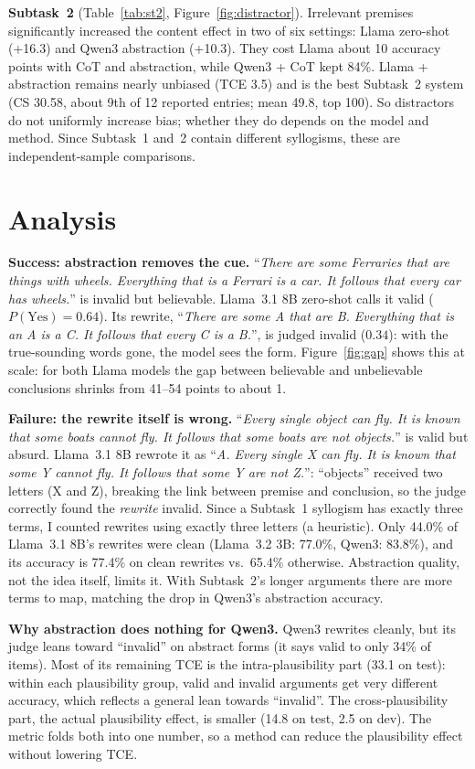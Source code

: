 \documentclass[11pt,letterpaper]{article}
\begin{document}
\textbf{Subtask~2} (Table~\ref{tab:st2}, Figure~\ref{fig:distractor}). Irrelevant premises significantly increased the content effect in two of six settings: Llama zero-shot (+16.3) and Qwen3 abstraction (+10.3). They cost Llama about 10 accuracy points with CoT and abstraction, while Qwen3 + CoT kept 84\%. Llama + abstraction remains nearly unbiased (TCE 3.5) and is the best Subtask~2 system (CS 30.58, about 9th of 12 reported entries; mean 49.8, top 100). So distractors do not uniformly increase bias; whether they do depends on the model and method. Since Subtask~1 and~2 contain different syllogisms, these are independent-sample comparisons.

\section{Analysis}

\textbf{Success: abstraction removes the cue.} ``\emph{There are some Ferraries that are things with wheels. Everything that is a Ferrari is a car. It follows that every car has wheels.}'' is invalid but believable. Llama~3.1 8B zero-shot calls it valid ($P(\text{Yes})=0.64$). Its rewrite, ``\emph{There are some A that are B. Everything that is an A is a C. It follows that every C is a B.}'', is judged invalid ($0.34$): with the true-sounding words gone, the model sees the form. Figure~\ref{fig:gap} shows this at scale: for both Llama models the gap between believable and unbelievable conclusions shrinks from 41--54 points to about 1.

\textbf{Failure: the rewrite itself is wrong.} ``\emph{Every single object can fly. It is known that some boats cannot fly. It follows that some boats are not objects.}'' is valid but absurd. Llama~3.1 8B rewrote it as ``\emph{A. Every single X can fly. It is known that some Y cannot fly. It follows that some Y are not Z.}'': ``objects'' received two letters (X and Z), breaking the link between premise and conclusion, so the judge correctly found the \emph{rewrite} invalid. Since a Subtask~1 syllogism has exactly three terms, I counted rewrites using exactly three letters (a heuristic). Only 44.0\% of Llama~3.1 8B's rewrites were clean (Llama~3.2 3B: 77.0\%, Qwen3: 83.8\%), and its accuracy is 77.4\% on clean rewrites vs.\ 65.4\% otherwise. Abstraction quality, not the idea itself, limits it. With Subtask~2's longer arguments there are more terms to map, matching the drop in Qwen3's abstraction accuracy.

\textbf{Why abstraction does nothing for Qwen3.} Qwen3 rewrites cleanly, but its judge leans toward ``invalid'' on abstract forms (it says valid to only 34\% of items). Most of its remaining TCE is the intra-plausibility part (33.1 on test): within each plausibility group, valid and invalid arguments get very different accuracy, which reflects a general lean towards ``invalid''. The cross-plausibility part, the actual plausibility effect, is smaller (14.8 on test, 2.5 on dev). The metric folds both into one number, so a method can reduce the plausibility effect without lowering TCE.
\end{document}
